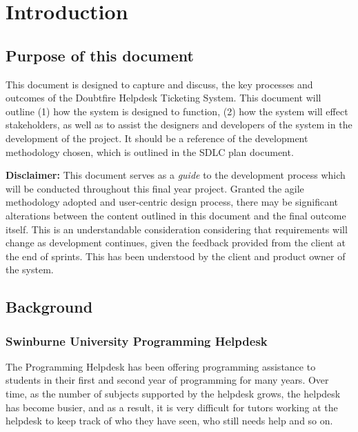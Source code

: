 \documentclass[12pt,a4paper,]{article}
\date{}
\begin{document}
{
\setcounter{tocdepth}{3}
\tableofcontents
}
\newpage
\section{Introduction}\label{introduction}

\subsection{Purpose of this document}\label{purpose-of-this-document}

This document is designed to capture and discuss, the key processes and
outcomes of the Doubtfire Helpdesk Ticketing System. This document will
outline (1) how the system is designed to function, (2) how the system
will effect stakeholders, as well as to assist the designers and
developers of the system in the development of the project. It should be
a reference of the development methodology chosen, which is outlined in
the SDLC plan document.

\textbf{Disclaimer:} This document serves as a \emph{guide} to the
development process which will be conducted throughout this final year
project. Granted the agile methodology adopted and user-centric design
process, there may be significant alterations between the content
outlined in this document and the final outcome itself. This is an
understandable consideration considering that requirements will change
as development continues, given the feedback provided from the client at
the end of sprints. This has been understood by the client and product
owner of the system.

\subsection{Background}\label{background}

\subsubsection{Swinburne University Programming
Helpdesk}\label{swinburne-university-programming-helpdesk}

The Programming Helpdesk has been offering programming assistance to
students in their first and second year of programming for many years.
Over time, as the number of subjects supported by the helpdesk grows,
the helpdesk has become busier, and as a result, it is very difficult
for tutors working at the helpdesk to keep track of who they have seen,
who still needs help and so on.
\end{document}
